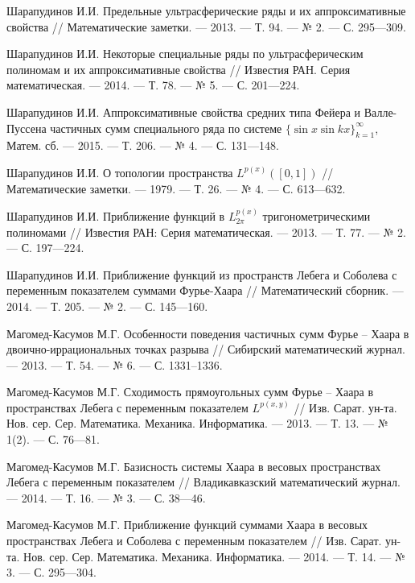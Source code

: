 \begin{thebibliography}{111}


Шарапудинов И.И. Предельные ультрасферические ряды и их
аппроксимативные свойства // Математические заметки. --- 2013. --- Т. 94. --- № 2. --- С. 295---309.

Шарапудинов И.И. Некоторые специальные ряды по ультрасферическим полиномам  и их аппроксимативные свойства //
Известия РАН. Серия математическая. --- 2014. --- Т. 78. --- № 5. --- С. 201---224.

Шарапудинов И.И. Аппроксимативные свойства средних типа Фейера и Валле-Пуссена частичных сумм специального ряда по системе $\{ \sin x\sin kx\}_{k=1}^\infty$, Матем. сб. --- 2015. --- Т. 206. --- № 4. --- С. 131---148.

Шарапудинов И.И. О топологии пространства
$ L^{p(x)}([0,1])$ // Математические заметки. --- 1979. --- Т. 26. --- № 4. --- С. 613---632.

Шарапудинов И.И. Приближение функций в $L^{p(x)}_{2\pi}$ тригонометрическими полиномами // Известия РАН: Серия математическая. --- 2013. --- Т. 77. --- № 2. --- С. 197---224.




Шарапудинов И.И. Приближение функций из пространств Лебега и Соболева с переменным показателем суммами Фурье-Хаара // Математический сборник. --- 2014. --- Т. 205. --- № 2. --- С. 145---160.

Магомед-Касумов М.Г. Особенности поведения частичных сумм Фурье -- Хаара в двоично-иррациональных точках разрыва // Сибирский математический журнал. --- 2013. --- Т. 54. --- № 6. --- С. 1331--1336.




Магомед-Касумов М.Г. Сходимость	прямоугольных сумм Фурье -- Хаара в	пространствах Лебега с переменным показателем $L^{p(x,y)}$ // Изв. Сарат. ун-та. Нов. сер. Сер. Математика. Механика. Информатика. --- 2013. --- Т. 13. --- № 1(2). --- С. 76---81.




Магомед-Касумов М.Г. Базисность системы	Хаара в весовых пространствах Лебега с переменным показателем // Владикавказский 	математический журнал. --- 2014. --- Т. 16. --- № 3. --- С. 38---46.




Магомед-Касумов М.Г. Приближение функций суммами Хаара в весовых пространствах Лебега и Соболева с переменным показателем // Изв. Сарат. ун-та. Нов. сер.	Сер. Математика. Механика. Информатика. --- 2014. --- Т. 14. --- № 3. --- С. 295---304.





\end{thebibliography}

